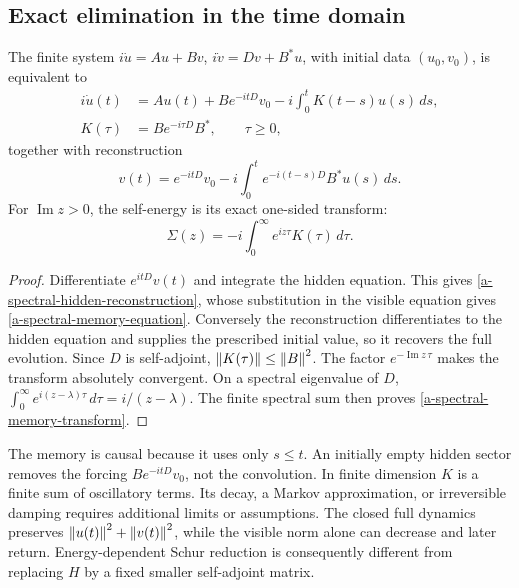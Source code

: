 \subsection{Exact elimination in the time domain}

\begin{theorem}
\label{a-spectral-memory-theorem}
The finite system
$i\dot u=Au+Bv$, $i\dot v=Dv+B^*u$, with initial data $(u_0,v_0)$,
is equivalent to
\begin{align}
 i\dot u(t)&=Au(t)+B e^{-itD}v_0
              -i\int_0^tK(t-s)u(s)\,ds,\nonumber\\
 K(\tau)&=B e^{-i\tau D}B^*,\qquad \tau\geq0,
 \label{a-spectral-memory-equation}
\end{align}
together with reconstruction
\begin{equation}
 v(t)=e^{-itD}v_0-i\int_0^te^{-i(t-s)D}B^*u(s)\,ds.
 \label{a-spectral-hidden-reconstruction}
\end{equation}
For $\operatorname{Im}z>0$, the self-energy is its exact one-sided transform:
\begin{equation}
 \Sigma(z)=-i\int_0^\infty e^{iz\tau}K(\tau)\,d\tau.
 \label{a-spectral-memory-transform}
\end{equation}
\end{theorem}
\begin{proof}
Differentiate $e^{itD}v(t)$ and integrate the hidden equation. This gives
\eqref{a-spectral-hidden-reconstruction}, whose substitution in the
visible equation gives \eqref{a-spectral-memory-equation}. Conversely
the reconstruction differentiates to the hidden equation and supplies
the prescribed initial value, so it recovers the full evolution.
Since $D$ is self-adjoint, $\left\lVert K(\tau)\right\rVert\leq\left\lVert B\right\rVert^2$.
The factor $e^{-\operatorname{Im}z\,\tau}$ makes the transform absolutely
convergent. On a spectral eigenvalue of $D$,
$\int_0^\infty e^{i(z-\lambda)\tau}\,d\tau=i/(z-\lambda)$.
The finite spectral sum then proves \eqref{a-spectral-memory-transform}.
\end{proof}

The memory is causal because it uses only $s\leq t$. An initially empty
hidden sector removes the forcing $B e^{-itD}v_0$, not the convolution.
In finite dimension $K$ is a finite sum of oscillatory terms. Its decay,
a Markov approximation, or irreversible damping requires additional
limits or assumptions. The closed full dynamics preserves
$\left\lVert u(t)\right\rVert^2+\left\lVert v(t)\right\rVert^2$, while the visible norm alone can decrease
and later return. Energy-dependent Schur reduction is consequently
different from replacing $H$ by a fixed smaller self-adjoint matrix.


